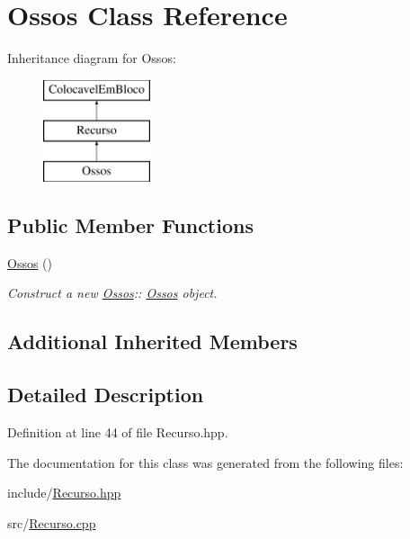\hypertarget{class_ossos}{}\section{Ossos Class Reference}
\label{class_ossos}
Inheritance diagram for Ossos\+:\begin{figure}[H]
\begin{center}
\leavevmode
\includegraphics[height=3.000000cm]{class_ossos}
\end{center}
\end{figure}
\subsection*{Public Member Functions}
\begin{DoxyCompactItemize}
\item 
\mbox{\label{class_ossos_a37b5a58e92f03645c8ae597de25e3df0}} 
\mbox{\hyperlink{class_ossos_a37b5a58e92f03645c8ae597de25e3df0}{Ossos}} ()
\begin{DoxyCompactList}\small\item\em Construct a new \mbox{\hyperlink{class_ossos}{Ossos}}\+:\+: \mbox{\hyperlink{class_ossos}{Ossos}} object. \end{DoxyCompactList}\end{DoxyCompactItemize}
\subsection*{Additional Inherited Members}


\subsection{Detailed Description}


Definition at line 44 of file Recurso.\+hpp.



The documentation for this class was generated from the following files\+:\begin{DoxyCompactItemize}
\item 
include/\mbox{\hyperlink{_recurso_8hpp}{Recurso.\+hpp}}\item 
src/\mbox{\hyperlink{_recurso_8cpp}{Recurso.\+cpp}}\end{DoxyCompactItemize}
